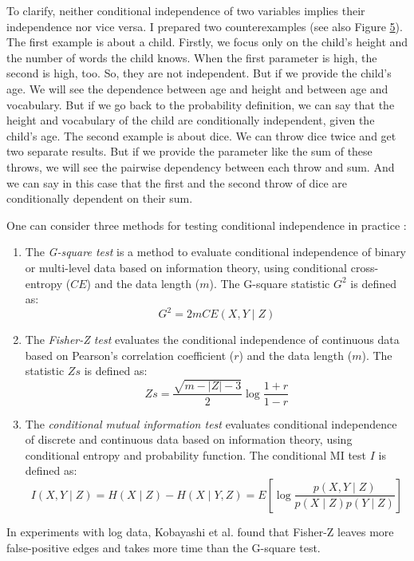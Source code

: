 To clarify, neither conditional independence of two variables implies their independence nor vice versa. I prepared two counterexamples (see also Figure \hyperref[fig:ci-example]{5}). The first example is about a child. Firstly, we focus only on the child's height and the number of words the child knows. When the first parameter is high, the second is high, too. So, they are not independent. But if we provide the child's age. We will see the dependence between age and height and between age and vocabulary. But if we go back to the probability definition, we can say that the height and vocabulary of the child are conditionally independent, given the child's age. The second example is about dice. We can throw dice twice and get two separate results. But if we provide the parameter like the sum of these throws, we will see the pairwise dependency between each throw and sum. And we can say in this case that the first and the second throw of dice are conditionally dependent on their sum. \newline

One can consider three methods for testing conditional independence in practice \cite{kobayashi2017mining}:
\begin{enumerate}
\item The \textit{G-square test} is a method to evaluate conditional independence of binary or multi-level data based on information theory, using conditional cross-entropy ($CE$) and the data length ($m$). The G-square statistic $G^2$ is defined as:
\begin{equation}
G^{2}=2 m C E(X, Y \mid Z)
\end{equation}
\item The \textit{Fisher-Z test} evaluates the conditional independence of continuous data based on Pearson's correlation coefficient ($r$) and the data length ($m$). The statistic $Zs$ is defined as:
\begin{equation}
Z s=\frac{\sqrt{m-|Z|-3}}{2} \log \frac{1+r}{1-r}
\end{equation}
\item The \textit{conditional mutual information test} evaluates conditional independence of discrete and continuous data based on information theory, using conditional entropy and probability function. The conditional MI test $I$ is defined as:
\begin{equation}
I(X , Y \mid Z)=H(X \mid Z)-H(X \mid Y, Z)=E\left[\log \frac{p(X, Y \mid Z)}{p(X \mid Z) p(Y \mid Z)}\right]
\end{equation}
\end{enumerate}
In experiments with log data, Kobayashi et al. \cite{kobayashi2017mining} found that Fisher-Z leaves more false-positive edges and takes more time than the G-square test. \newline

